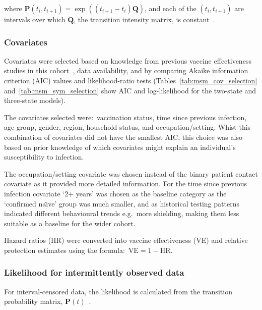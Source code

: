 where $\mathbf{P}(t_i, t_{i+1}) = \exp((t_{i+1}-t_i)\mathbf{Q})$, and each of the $(t_i, t_{i+1})$ are intervals over which $\mathbf{Q}$, the transition intensity matrix, is constant~\parencite{van-den-Hout2016-xy}.

\subsubsection{Covariates}

Covariates were selected based on knowledge from previous vaccine effectiveness studies in this cohort~\parencite{Hall2021-si, Hall2022-ep, Hall2024-ai}, data availability, and by comparing Akaike information criterion (AIC) values and likelihood-ratio tests (Tables~\ref{tab:msm_cov_selection} and~\ref{tab:msm_sym_selection} show AIC and log-likelihood for the two-state and three-state models).

The covariates selected were:\ vaccination status, time since previous infection, age group, gender, region, household status, and occupation/setting. Whist this combination of covariates did not have the smallest AIC, this choice was also based on prior knowledge of which covariates might explain an individual's susceptibility to infection.

The occupation/setting covariate was chosen instead of the binary patient contact covariate as it provided more detailed information. For the time since previous infection covariate `2+ years' was chosen as the baseline category as the `confirmed na\"{\i}ve' group was much smaller, and as historical testing patterns indicated different behavioural trends e.g.\ more shielding, making them less suitable as a baseline for the wider cohort.

Hazard ratios (HR) were converted into vaccine effectiveness (VE) and relative protection estimates using the formula:\ $\text{VE} = 1 - \text{HR}$\@.


\clearpage


\subsubsection{Likelihood for intermittently observed data}

For interval-censored data, the likelihood is calculated from the transition probability matrix, $\mathbf{P}(t)$~\parencite{Kalbfleisch1985-at}.

